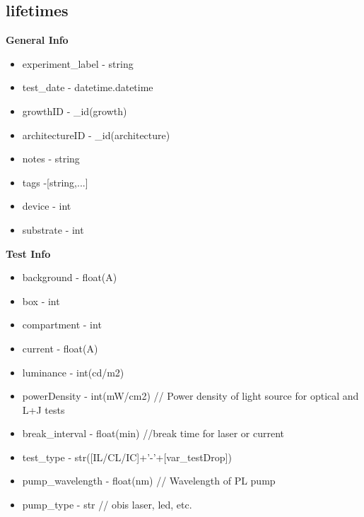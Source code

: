 \documentclass[../thesis.tex]{subfiles}
\begin{document}
\subsection{lifetimes}

\textbf{General Info}

\begin{itemize}
\item experiment\_label - string
\item test\_date - datetime.datetime
\item growthID - \_id(growth)
\item architectureID - \_id(architecture)
\item notes - string
\item tags -[string,...]
\item device - int
\item substrate - int
\end{itemize}

\textbf{Test Info}
\begin{itemize}
\item background - float(A)
\item box - int
\item compartment - int
\item current - float(A)
\item luminance - int(cd/m2)
\item powerDensity - int(mW/cm2) // Power density of light source for optical and L+J tests
\item break\_interval - float(min) //break time for laser or current
\item test\_type - str([IL/CL/IC]+'-'+[var\_testDrop])
\item pump\_wavelength - float(nm) // Wavelength of PL pump
\item pump\_type - str // obis laser, led, etc.
\end{itemize}
\end{document}
